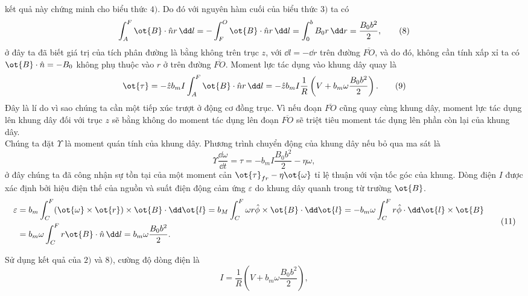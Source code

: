 \begin{loigiai}
kết quả này chứng minh cho biểu thức $4)$. Do đó với nguyên hàm cuối của biểu thức $3)$ ta có 
   \[\int_{A}^{F} \ot{B}\cdot \hat{n} r \, \dd l= - \int_{F}^{O} \ot{B} \cdot \hat{n} r \, \dd l = \int_{0}^{b} B_0 r \, \dd r = \frac{B_0 b^2}{2}, \tag{8} \]
ở đây ta đã biết giá trị của tích phân đường là bằng không trên trục $z$, với $\dd l = - \dd r $ trên đường $\overline{FO}$, và do đó, không cần tính xấp xỉ ta có $\ot{B}\cdot\hat{n} = -B_0$ không phụ thuộc vào $r$ ở trên đường $\overline{FO}$. Moment lực tác dụng vào khung dây quay là 
    \[\ot{\tau} = - {\hat{z}} b_m I \int_{A}^{F} \ot{B}\cdot \hat{n} r \, \dd l = - {\hat{z}} b_m I \frac{1}{R} \left( V + b_m \omega \frac{B_0 b^2}{2}\right) . \tag{9} \]
Đây là lí do vì sao chúng ta cần một tiếp xúc trượt ở động cơ đồng trục. Vì nếu đoạn $\overline{FO}$ cũng quay cùng khung dây, moment lực tác dụng lên khung dây đối với trục $z$ sẽ bằng không do moment tác dụng lên đoạn $\overline{FO}$ sẽ triệt tiêu moment tác dụng lên phần còn lại của khung dây.\\
Chúng ta đặt $\Upsilon$ là moment quán tính của khung dây. Phương trình chuyển động của khung dây nếu bỏ qua ma sát là
       \[ \Upsilon \frac{\dd \omega}{\dd t} = \tau = -b_m I\frac{B_0 b^2}{2} - \eta \omega, \tag{10} \]
ở đây chúng ta đã công nhận sự tồn tại của một moment cản $\ot{\tau}_{fr}-\eta\ot{\omega}$ tỉ lệ thuận với vận tốc góc của khung. Dòng điện $I$ được xác định bởi hiệu điện thế của nguồn và suất điện động cảm ứng $\varepsilon$ do khung dây quanh trong từ trường $\ot{B}$.
     \[\begin{aligned} \varepsilon &= b_m \int_{C}^{F} (\ot{\omega} \times \ot{r}) \times \ot{B}\cdot \dd \ot{l} = b_M \int_{C}^{F} \omega r \hat{{\phi}}\times \ot{B} \cdot \dd \ot{l} = -b_m \omega \int_{C}^{F} r \hat{{\phi}}\cdot \dd \ot{l}\times \ot{B} \\
   &= b_m \omega \int_{C}^{F} r \ot{B} \cdot \hat{n} \, \dd l = b_m \omega \frac{B_0 b^2}{2}. \end{aligned} \tag{11} \]

Sử dụng kết quả của $2)$ và $8)$, cường độ dòng điện là 
    \[ I = \frac{1}{R} \left( V + b_m \omega \frac{B_0 b^2}{2}\right), \tag{12}\]


\end{loigiai}
